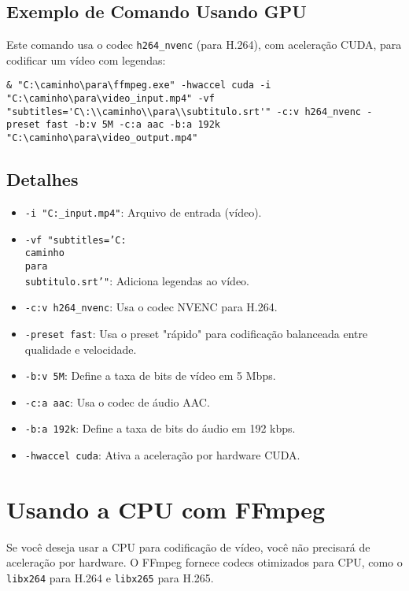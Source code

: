 \documentclass{article}
\begin{document}
\subsection{Exemplo de Comando Usando GPU}

Este comando usa o codec \texttt{h264\_nvenc} (para H.264), com aceleração CUDA, para codificar um vídeo com legendas:

\begin{lstlisting}
& "C:\caminho\para\ffmpeg.exe" -hwaccel cuda -i "C:\caminho\para\video_input.mp4" -vf "subtitles='C\:\\caminho\\para\\subtitulo.srt'" -c:v h264_nvenc -preset fast -b:v 5M -c:a aac -b:a 192k "C:\caminho\para\video_output.mp4"
\end{lstlisting}

\subsection{Detalhes}

\begin{itemize}
    \item \texttt{-i "C:\caminho\para\video\_input.mp4"}: Arquivo de entrada (vídeo).
    \item \texttt{-vf "subtitles='C:\\caminho\\para\\subtitulo.srt'"}: Adiciona legendas ao vídeo.
    \item \texttt{-c:v h264\_nvenc}: Usa o codec NVENC para H.264.
    \item \texttt{-preset fast}: Usa o preset "rápido" para codificação balanceada entre qualidade e velocidade.
    \item \texttt{-b:v 5M}: Define a taxa de bits de vídeo em 5 Mbps.
    \item \texttt{-c:a aac}: Usa o codec de áudio AAC.
    \item \texttt{-b:a 192k}: Define a taxa de bits do áudio em 192 kbps.
    \item \texttt{-hwaccel cuda}: Ativa a aceleração por hardware CUDA.
\end{itemize}

\section{Usando a CPU com FFmpeg}

Se você deseja usar a CPU para codificação de vídeo, você não precisará de aceleração por hardware. O FFmpeg fornece codecs otimizados para CPU, como o \texttt{libx264} para H.264 e \texttt{libx265} para H.265.
\end{document}
